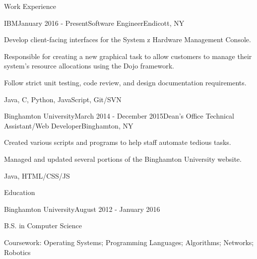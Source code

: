 \documentclass{resume} %
\begin{document}

\begin{rSection}{Work Experience}

\begin{rSubsection}{IBM}{January 2016 - Present}{Software Engineer}{Endicott, NY}
\item Develop client-facing interfaces for the System z Hardware Management Console.
\item Responsible for creating a new graphical task to allow customers to manage their \\ system's resource allocations using the Dojo framework.
\item Follow strict unit testing, code review, and design documentation requirements.
\item Java, C, Python, JavaScript, Git/SVN
\end{rSubsection}


\begin{rSubsection}{Binghamton University}{March 2014 - December 2015}{Dean's Office Technical Assistant/Web Developer}{Binghamton, NY}
\item Created various scripts and programs to help staff automate tedious tasks.
\item Managed and updated several portions of the Binghamton University website.
\item Java, HTML/CSS/JS
\end{rSubsection}

\end{rSection}


\begin{rSection}{Education}


\begin{rSubsection}{Binghamton University}{August 2012 - January 2016}{}{}
\item B.S. in Computer Science
\item Coursework: Operating Systems; Programming Languages; Algorithms; Networks; Robotics
\end{rSubsection}

\end{rSection}
\end{document}
